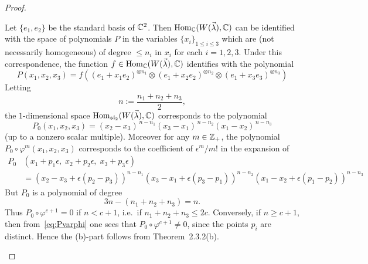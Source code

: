 \documentclass[12pt]{article}
\begin{document}
\begin{proof}
\begin{enumerate}
              Let $\{e_1,e_2\}$ be the standard basis of $\mathbb{C}^2$.
              Then $\operatorname{Hom}_{\mathbb{C}}(W(\vec\lambda),\mathbb{C})$ can be identified with the space of
              polynomials $P$ in the variables $\{x_i\}_{1\le i\le3}$ which are (not necessarily homogeneous) of degree $\le n_i$ in $x_i$ for each $i=1,2,3$.
              Under this correspondence, the function $f\in\operatorname{Hom}_{\mathbb{C}}(W(\vec\lambda),\mathbb{C})$ identifies with the polynomial
                \[  
                  P(x_1,x_2,x_3)=
                  f\!\left((e_1+x_1e_2)^{\otimes n_1}\otimes
                  (e_1+x_2e_2)^{\otimes n_2}\otimes
                  (e_1+x_3e_3)^{\otimes n_3}\right)\]
              Letting
              \[
                  n:=\frac{n_1+n_2+n_3}{2},
              \]
              the $1$-dimensional space $\operatorname{Hom}_{\mathfrak{sl}_2}(W(\vec\lambda),\mathbb{C})$
              corresponds to the polynomial
              \[
                  P_0(x_1,x_2,x_3)
                  =(x_2-x_3)^{\,n-n_1}(x_3-x_1)^{\,n-n_2}(x_1-x_2)^{\,n-n_3}
              \]
              (up to a nonzero scalar multiple).
              Moreover for any $m\in\mathbb{Z}_+$, the polynomial $P_0\circ\varphi^m(x_1,x_2,x_3)$ corresponds to the coefficient of $\epsilon^m/m!$ in the expansion of
              \begin{equation}\label{eq:Pvarphi}
                  \begin{aligned}
                      P_0 & (x_1+p_1\epsilon,\;x_2+p_2\epsilon,\;x_3+p_3\epsilon) \\
                          & =(x_2-x_3+\epsilon(p_2-p_3))^{n-n_1}
                      (x_3-x_1+\epsilon(p_3-p_1))^{n-n_2}
                      (x_1-x_2+\epsilon(p_1-p_2))^{n-n_3}
                  \end{aligned}
              \end{equation}
              But $P_0$ is a polynomial of degree
              \[
                  3n-(n_1+n_2+n_3)=n.
              \]
              Thus $P_0\circ\varphi^{c+1}=0$ if $n<c+1$, i.e.\ if
              $n_1+n_2+n_3\le2c$.
              Conversely, if $n\ge c+1$, then from~\eqref{eq:Pvarphi} one sees that
              $P_0\circ\varphi^{c+1}\neq0$, since the points $p_i$ are distinct.
              Hence the (b)-part follows from Theorem~2.3.2(b).
    \end{enumerate}
\end{proof}
\end{document}
